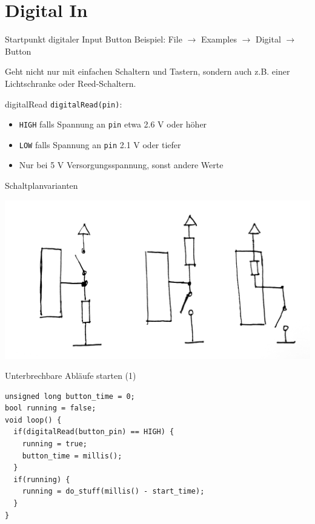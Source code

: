 \documentclass[bigger]{beamer}
\begin{document}
\section{Digital In}
\label{sec:org6a71adf}
\begin{frame}[label={sec:org2e58cec}]{Startpunkt digitaler Input}
Button Beispiel: File \(\rightarrow\) Examples \(\rightarrow\) Digital
\(\rightarrow\) Button

Geht nicht nur mit einfachen Schaltern und Tastern, sondern auch
z.B. einer Lichtschranke oder Reed-Schaltern.
\end{frame}

\begin{frame}[fragile,label={sec:org60edc24}]{digitalRead}
 \texttt{digitalRead(pin)}: 
\begin{itemize}
\item \texttt{HIGH} falls Spannung an \texttt{pin} etwa 2.6 V oder höher
\item \texttt{LOW} falls Spannung an \texttt{pin} 2.1 V oder tiefer
\item Nur bei 5 V Versorgungsspannung, sonst andere Werte
\end{itemize}
\end{frame}

\begin{frame}[label={sec:org17edcc8}]{Schaltplanvarianten}
\begin{center}
\includegraphics[width=.9\linewidth]{./img/pullup.jpg}
\end{center}
\end{frame}

\begin{frame}[fragile,label={sec:orgde53344}]{Unterbrechbare Abläufe starten (1)}
 \begin{verbatim}
unsigned long button_time = 0;
bool running = false;
void loop() {
  if(digitalRead(button_pin) == HIGH) {
    running = true;
    button_time = millis();
  }
  if(running) {
    running = do_stuff(millis() - start_time);
  }
}
\end{verbatim}
\end{frame}
\end{document}
